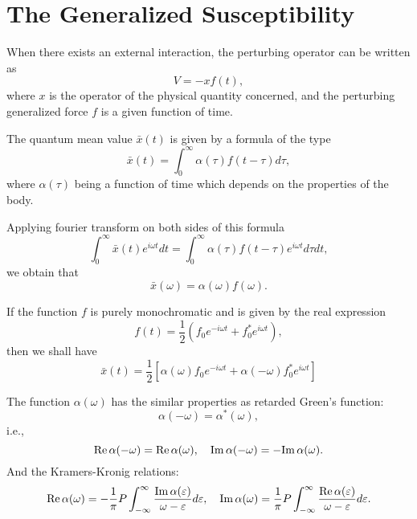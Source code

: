 \documentclass{book}
\renewcommand{\Re}{{\rm Re}}
\renewcommand{\Im}{{\rm Im}}
\numberwithin{equation}{section}
\begin{document}
\section{The Generalized Susceptibility}
When there exists an external interaction, the perturbing operator can
be written as
\begin{equation}
  V=-xf(t),  
\end{equation}
where $x$ is the operator of the physical quantity concerned, and the
perturbing generalized force $f$ is a given function of time.

The quantum mean value $\bar{x}(t)$ is given by a formula of the type
\begin{equation}
  \bar{x}(t)=\int_0^\infty\alpha(\tau)f(t-\tau)d\tau,
\end{equation}
where $\alpha(\tau)$ being a function of time which depends on the
properties of the body.

Applying fourier transform on both sides of this formula
\begin{equation}
  \int_0^\infty\bar{x}(t)e^{i\omega t}dt=
  \int_0^\infty\alpha(\tau)f(t-\tau)e^{i\omega t}d\tau dt,
\end{equation}
we obtain that
\begin{equation}
  \bar{x}(\omega)=\alpha(\omega)f(\omega).
\end{equation}

If the function $f$ is purely monochromatic and is given by the real
expression
\begin{equation}
  f(t)=\frac{1}{2}(f_0e^{-i\omega t}+f_0^*e^{i\omega t}),
  \label{generalized-force}
\end{equation}
then we shall have 
\begin{equation}
  \bar{x}(t)=\frac{1}{2}[\alpha(\omega)f_0e^{-i\omega t}
    +\alpha(-\omega)f_0^*e^{i\omega t}]
  \label{generalized-x}
\end{equation}

The function $\alpha(\omega)$ has the similar properties as retarded
Green's function:
\begin{equation}
  \alpha(-\omega)=\alpha^*(\omega),
\end{equation}
i.e.,
\begin{equation}
  \Re\,\alpha(-\omega)=\Re\,\alpha(\omega),\quad
  \Im\,\alpha(-\omega)=-\Im\,\alpha(\omega).
\end{equation}
And the Kramers-Kronig relations:
\begin{equation}
  \Re\,\alpha(\omega)=-\frac{1}{\pi}P\int_{-\infty}^\infty
  \frac{\Im\,\alpha(\varepsilon)}{\omega-\varepsilon}d\varepsilon,\quad
  \Im\,\alpha(\omega)=\frac{1}{\pi}P\int_{-\infty}^\infty
  \frac{\Re\,\alpha(\varepsilon)}{\omega-\varepsilon}d\varepsilon.
\end{equation}
\end{document}
